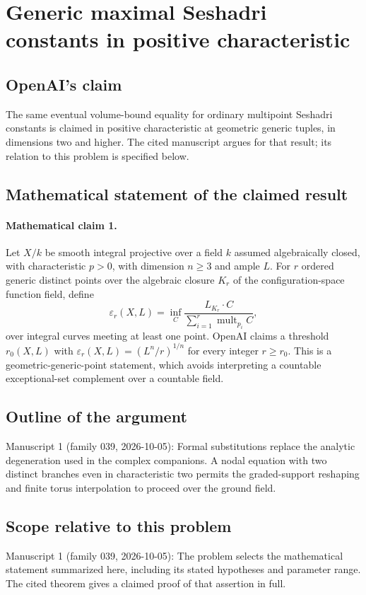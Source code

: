 \documentclass[11pt]{article}
\begin{document}
\section*{Generic maximal Seshadri constants in positive characteristic}

\subsection{OpenAI's claim}
The same eventual volume-bound equality for ordinary multipoint Seshadri constants is claimed in positive characteristic at geometric generic tuples, in dimensions two and higher. The cited manuscript argues for that result; its relation to this problem is specified below.

\subsection{Mathematical statement of the claimed result}
\paragraph{Mathematical claim 1.} Let $X/k$ be smooth integral projective over a field $k$ assumed algebraically closed, with characteristic $p>0$, with dimension $n\ge3$ and ample $L$. For $r$ ordered generic distinct points over the algebraic closure $K_r$ of the configuration-space function field, define
\[
\varepsilon_r(X,L)=\inf_C\frac{L_{K_r}\cdot C}{\sum_{i=1}^r\operatorname{mult}_{p_i}C},
\]
over integral curves meeting at least one point. OpenAI claims a threshold $r_0(X,L)$ with $\varepsilon_r(X,L)=(L^n/r)^{1/n}$ for every integer $r\ge r_0$. This is a geometric-generic-point statement, which avoids interpreting a countable exceptional-set complement over a countable field.

\subsection{Outline of the argument}
Manuscript 1 (family 039, 2026-10-05): Formal substitutions replace the analytic degeneration used in the complex companions. A nodal equation with two distinct branches even in characteristic two permits the graded-support reshaping and finite torus interpolation to proceed over the ground field.

\subsection{Scope relative to this problem}
Manuscript 1 (family 039, 2026-10-05): The problem selects the mathematical statement summarized here, including its stated hypotheses and parameter range. The cited theorem gives a claimed proof of that assertion in full.
\end{document}

